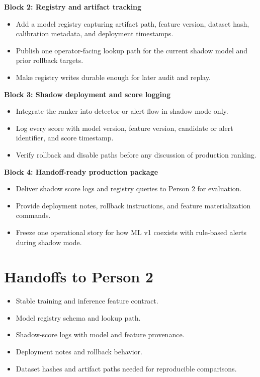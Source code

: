 \documentclass{article}
\begin{document}
\textbf{Block 2: Registry and artifact tracking}
\begin{itemize}
\item Add a model registry capturing artifact path, feature version, dataset hash, calibration metadata, and deployment timestamps.
\item Publish one operator-facing lookup path for the current shadow model and prior rollback targets.
\item Make registry writes durable enough for later audit and replay.
\end{itemize}

\textbf{Block 3: Shadow deployment and score logging}
\begin{itemize}
\item Integrate the ranker into detector or alert flow in shadow mode only.
\item Log every score with model version, feature version, candidate or alert identifier, and score timestamp.
\item Verify rollback and disable paths before any discussion of production ranking.
\end{itemize}

\textbf{Block 4: Handoff-ready production package}
\begin{itemize}
\item Deliver shadow score logs and registry queries to Person 2 for evaluation.
\item Provide deployment notes, rollback instructions, and feature materialization commands.
\item Freeze one operational story for how ML v1 coexists with rule-based alerts during shadow mode.
\end{itemize}

\section*{Handoffs to Person 2}
\begin{itemize}
\item Stable training and inference feature contract.
\item Model registry schema and lookup path.
\item Shadow-score logs with model and feature provenance.
\item Deployment notes and rollback behavior.
\item Dataset hashes and artifact paths needed for reproducible comparisons.
\end{itemize}
\end{document}
